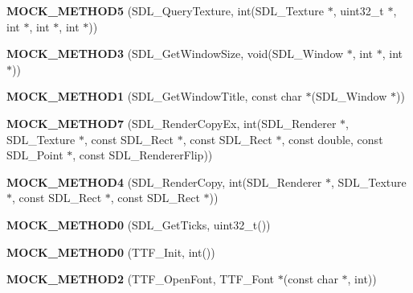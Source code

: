 \begin{DoxyCompactItemize}
{\bfseries M\+O\+C\+K\+\_\+\+M\+E\+T\+H\+O\+D5} (S\+D\+L\+\_\+\+Query\+Texture, int(S\+D\+L\+\_\+\+Texture $\ast$, uint32\+\_\+t $\ast$, int $\ast$, int $\ast$, int $\ast$))
\item 
\mbox{\label{classSDLMock_aaa0d5ea9ea703f31eebb2a18bf119828}} 
{\bfseries M\+O\+C\+K\+\_\+\+M\+E\+T\+H\+O\+D3} (S\+D\+L\+\_\+\+Get\+Window\+Size, void(S\+D\+L\+\_\+\+Window $\ast$, int $\ast$, int $\ast$))
\item 
\mbox{\label{classSDLMock_a4e3accd6fba192ed90c06729ce3fa566}} 
{\bfseries M\+O\+C\+K\+\_\+\+M\+E\+T\+H\+O\+D1} (S\+D\+L\+\_\+\+Get\+Window\+Title, const char $\ast$(S\+D\+L\+\_\+\+Window $\ast$))
\item 
\mbox{\label{classSDLMock_afdff18b55ec4e6b488db8440581b9d20}} 
{\bfseries M\+O\+C\+K\+\_\+\+M\+E\+T\+H\+O\+D7} (S\+D\+L\+\_\+\+Render\+Copy\+Ex, int(S\+D\+L\+\_\+\+Renderer $\ast$, S\+D\+L\+\_\+\+Texture $\ast$, const S\+D\+L\+\_\+\+Rect $\ast$, const S\+D\+L\+\_\+\+Rect $\ast$, const double, const S\+D\+L\+\_\+\+Point $\ast$, const S\+D\+L\+\_\+\+Renderer\+Flip))
\item 
\mbox{\label{classSDLMock_a0494f469f47cb2f5591dc22d400aca08}} 
{\bfseries M\+O\+C\+K\+\_\+\+M\+E\+T\+H\+O\+D4} (S\+D\+L\+\_\+\+Render\+Copy, int(S\+D\+L\+\_\+\+Renderer $\ast$, S\+D\+L\+\_\+\+Texture $\ast$, const S\+D\+L\+\_\+\+Rect $\ast$, const S\+D\+L\+\_\+\+Rect $\ast$))
\item 
\mbox{\label{classSDLMock_abe4a22b5adce6b21b9dd81c7929ebff7}} 
{\bfseries M\+O\+C\+K\+\_\+\+M\+E\+T\+H\+O\+D0} (S\+D\+L\+\_\+\+Get\+Ticks, uint32\+\_\+t())
\item 
\mbox{\label{classSDLMock_a7d11b0bd17dd806269d1a6d118687fbb}} 
{\bfseries M\+O\+C\+K\+\_\+\+M\+E\+T\+H\+O\+D0} (T\+T\+F\+\_\+\+Init, int())
\item 
\mbox{\label{classSDLMock_aa451d78bba36016af9c89ed21b757aed}} 
{\bfseries M\+O\+C\+K\+\_\+\+M\+E\+T\+H\+O\+D2} (T\+T\+F\+\_\+\+Open\+Font, T\+T\+F\+\_\+\+Font $\ast$(const char $\ast$, int))
\item 
\mbox{\label{classSDLMock_a167f794e4df063476013a91307afdbe1}} 

\end{DoxyCompactItemize}
